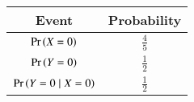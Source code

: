 
\begin{center}
\begin{tabular}{|c|c|}
\hline
\textbf{Event}& \textbf{Probability} \\ \hline
$\Pr\left(X = 0\right)$ & 	$\frac{4}{5}$ \\ \hline
$\Pr\left(Y = 0\right)$ & 	$\frac{1}{2}$ \\ \hline
$\Pr\left(Y = 0 \mid X= 0\right)$ &  $\frac{1}{2}$ \\ \hline
\end{tabular}
\end{center}
